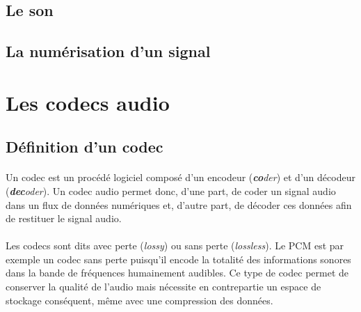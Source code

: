 \documentclass{article}
\begin{document}
    \subsection{Le son}





    \subsection{La numérisation d'un signal}
    \label{audionumerique}


    \newpage
    \section{Les codecs audio}
    \subsection{Définition d'un codec}
    \paragraph{}
    Un codec est un procédé logiciel composé d'un encodeur (\emph{\textbf{co}der}) et d'un décodeur (\emph{\textbf{dec}oder})\cite{wiki:codec}. Un codec audio permet donc, d'une part, de coder un signal audio dans un flux de données numériques et, d'autre part, de décoder ces données afin de restituer le signal audio.

    \paragraph{}
    Les codecs sont dits avec perte (\emph{lossy}) ou sans perte (\emph{lossless}). Le PCM est par exemple un codec sans perte puisqu'il encode la totalité des informations sonores dans la bande de fréquences humainement audibles. Ce type de codec permet de conserver la qualité de l'audio mais nécessite en contrepartie un espace de stockage conséquent, même avec une compression des données.
\end{document}
